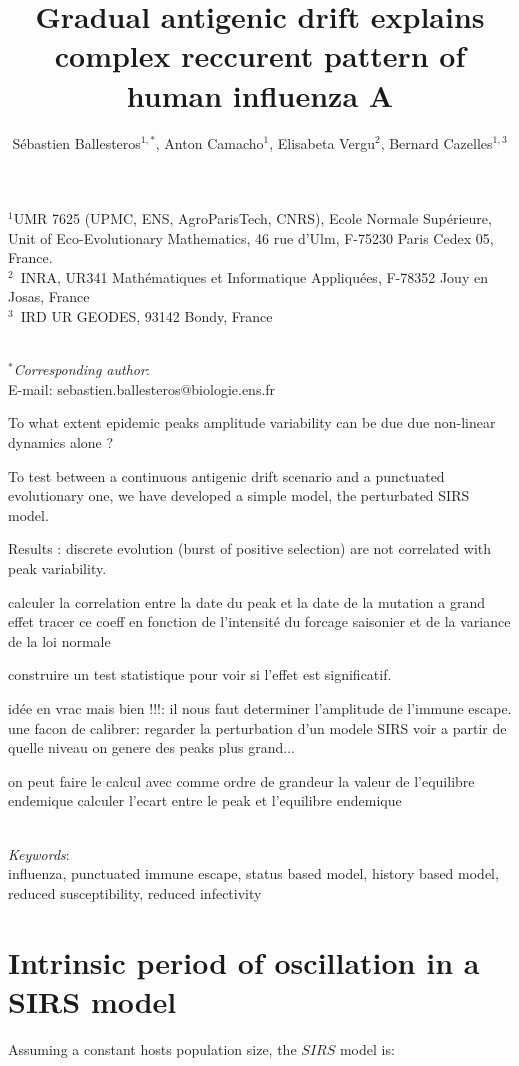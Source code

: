 \documentclass[12pt]{article}
\title{Gradual antigenic drift explains complex reccurent pattern of human influenza A}
\author{Sébastien Ballesteros$^{1,*}$, Anton Camacho$^{1}$, Elisabeta Vergu$^{2}$, Bernard Cazelles$^{1,3}$}
\date{}
\begin{document}
\maketitle

$^1$UMR 7625  (UPMC, ENS, AgroParisTech, CNRS), Ecole Normale Supérieure, Unit of Eco-Evolutionary Mathematics,  46 rue d'Ulm, F-75230 Paris Cedex 05, France. \\
$^2$~INRA, UR341 Mathématiques et Informatique Appliquées, F-78352 Jouy en Josas, France \\
$^3$~IRD UR GEODES, 93142 Bondy, France

~\\
$^*$\textit{Corresponding author}:  \\
E-mail: sebastien.ballesteros@biologie.ens.fr

\abstract{}


To what extent epidemic peaks amplitude variability can be due due non-linear dynamics alone ?

To test between a continuous antigenic drift scenario and a punctuated evolutionary one, we have developed a simple model, the perturbated SIRS model.

Results : 
discrete evolution (burst of positive selection) are not correlated with peak variability.

calculer la correlation entre la date du peak et la date de la mutation a grand effet
tracer ce coeff en fonction de l'intensité du forcage saisonier et de la variance de la loi normale

construire un test statistique pour voir si l'effet est significatif.


idée en vrac mais bien !!!:
il nous faut determiner l'amplitude de l'immune escape.
une facon de calibrer: regarder la perturbation d'un modele SIRS voir a partir de quelle niveau on genere des peaks plus grand...

on peut faire le calcul avec comme ordre de grandeur la valeur de l'equilibre endemique
calculer l'ecart entre le peak et l'equilibre endemique

~ \\
\textit{Keywords}: \\
influenza, punctuated immune escape, status based model, history based
model, reduced susceptibility, reduced infectivity

\section{Intrinsic period of oscillation in a SIRS model}
Assuming a constant hosts population size, the $SIRS$ model is:
\end{document}
